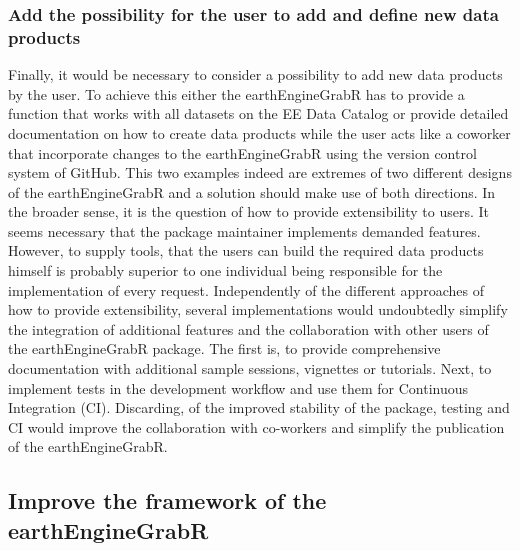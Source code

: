\subsubsection{Add the possibility for the user to add and define new data products}

Finally, it would be necessary to consider a possibility to add new data products by the user. To achieve this either the earthEngineGrabR has to provide a function that works with all datasets on the EE Data Catalog or provide detailed documentation on how to create data products while the user acts like a coworker that incorporate changes to the earthEngineGrabR using the version control system of GitHub. This two examples indeed are extremes of two different designs of the earthEngineGrabR and a solution should make use of both directions. In the broader sense, it is the question of how to provide extensibility to users. It seems necessary that the package maintainer implements demanded features. However, to supply tools, that the users can build the required data products himself is probably superior to one individual being responsible for the implementation of every request.
Independently of the different approaches of how to provide extensibility, several implementations would undoubtedly simplify the integration of additional features and the collaboration with other users of the earthEngineGrabR package. The first is, to provide comprehensive documentation with additional sample sessions, vignettes or tutorials. Next, to implement tests in the development workflow and use them for Continuous Integration (CI). Discarding, of the improved stability of the package, testing and CI would improve the collaboration with co-workers and simplify the publication of the earthEngineGrabR. 

\subsection{Improve the framework of the earthEngineGrabR}

